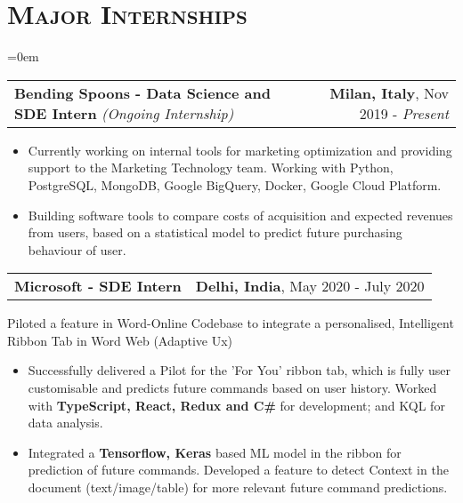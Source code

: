 \documentclass{article}
\makeatletter
\newcommand{\headerrow}[2]
{\begin{tabular*}{\linewidth}{l@{\extracolsep{\fill}}r}
	#1 &
	#2 \\
\end{tabular*}}
\newcommand{\tmpsection}[1]{}
\let\tmpsection=\section
\renewcommand{\section}[1]{\tmpsection*{\textsc{#1}}}
\makeatother
\begin{document}
\section{Major Internships}
\begin{list} {}{\leftmargin=0em}
\setlength{\leftmargin}{0pt}
      \item[]
    \headerrow {\textbf{Bending Spoons - Data Science and SDE Intern}  \textit{(Ongoing Internship)}}{\textbf{Milan, Italy},  Nov 2019 - \textit{Present}}
    \begin{itemize}
    \setlength\itemsep{0.0em}
        \item Currently working on internal tools for marketing optimization and providing support to the Marketing Technology team. Working with Python, PostgreSQL, MongoDB, Google BigQuery, Docker, Google Cloud Platform.
        \item Building software tools to compare costs of acquisition and expected revenues from users, based on a statistical model to predict future purchasing behaviour of user.
    \end{itemize}
    
    \item[]

    \headerrow {\textbf{Microsoft - SDE Intern} }{\textbf{Delhi, India},  May 2020 - July 2020}
    Piloted a feature in Word-Online Codebase to integrate a personalised, Intelligent Ribbon Tab in Word Web (Adaptive Ux)
    \begin{itemize}
    \setlength\itemsep{0.0em}
        \item Successfully delivered a Pilot for the 'For You' ribbon tab, which is fully user customisable and predicts future commands based on user history. Worked with \textbf{TypeScript, React, Redux and C\#} for development; and KQL for data analysis.
        \item Integrated a \textbf{Tensorflow, Keras} based ML model in the ribbon for prediction of future commands. Developed a feature to detect Context in the document (text/image/table) for more relevant future command predictions.
    \end{itemize}
    

\end{list}
\end{document}
